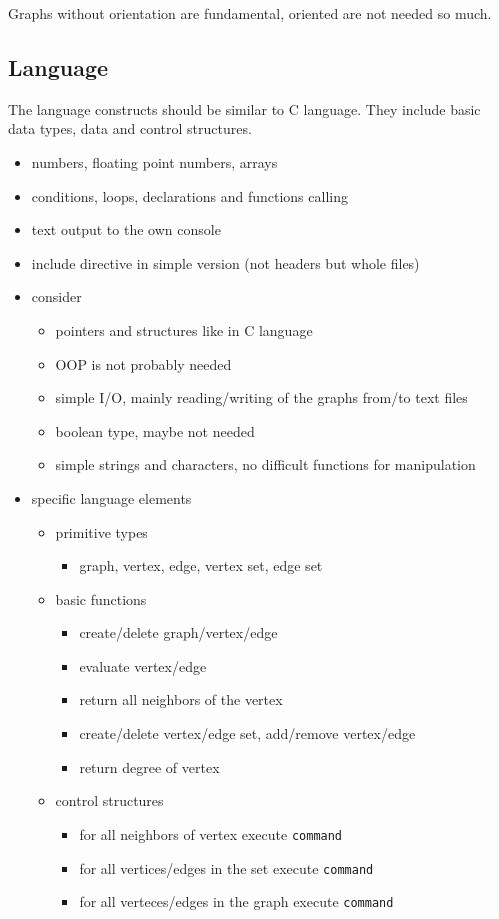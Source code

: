 \documentclass[11pt,twoside,a4paper]{book}
\begin{document}
Graphs without orientation are fundamental, oriented are not needed so much.

\subsection{Language}

The language constructs should be similar to C language. They include basic data types, data and control structures.

\begin{itemize}
\item numbers, floating point numbers, arrays
\item conditions, loops, declarations and functions calling
\item text output to the own console
\item include directive in simple version (not headers but whole files)

\item consider
	\begin{itemize}
	\item pointers and structures like in C language
	\item OOP is not probably needed
	\item simple I/O, mainly reading/writing of the graphs from/to text files
	\item boolean type, maybe not needed
	\item simple strings and characters, no difficult functions for manipulation
	\end{itemize}

\item specific language elements
	\begin{itemize}
	\item primitive types
		\begin{itemize}
		\item graph, vertex, edge, vertex set, edge set
		\end{itemize}
	\item basic functions
		\begin{itemize}
		\item create/delete graph/vertex/edge
		\item evaluate vertex/edge
		\item return all neighbors of the vertex
		\item create/delete vertex/edge set, add/remove vertex/edge
		\item return degree of vertex
		\end{itemize}
	\item control structures
		\begin{itemize}
		\item for all neighbors of vertex execute \texttt{command}
		\item for all vertices/edges in the set execute \texttt{command}
		\item for all verteces/edges in the graph execute \texttt{command}
		\end{itemize}
	\end{itemize}
\end{itemize}
\end{document}

